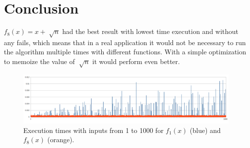 \documentclass{article}
\begin{document}
\section{Conclusion}

$f_8(x) = x+\sqrt[]{n}$ had the best result with lowest time execution and without any fails, which means that in a real application it would not be necessary to run the algorithm multiple times with different functions. With a simple optimization to memoize the value of $\sqrt[]{n}$ it would perform even better.

\begin{figure}[h!]
\centering
\includegraphics[scale=0.30]{f1_f8.png}
\caption{Execution times with inputs from 1 to 1000 for $f_1(x)$ (blue) and $f_8(x)$ (orange).}
\label{fig2}
\end{figure}





\end{document}
